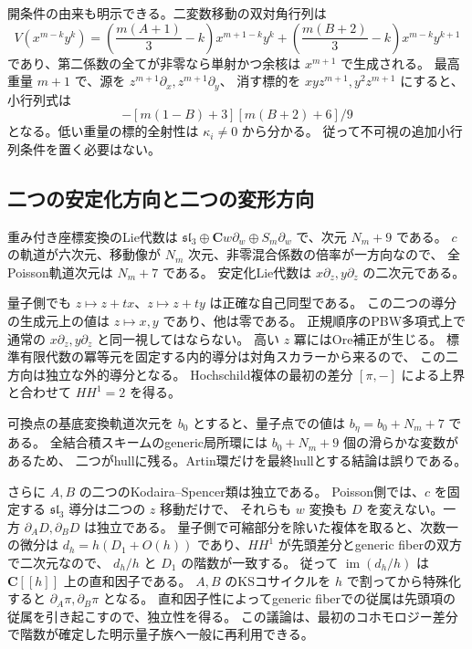 開条件の由来も明示できる。二変数移動の双対角行列は
\[
 V(x^{m-k}y^k)=
 \left(\frac{m(A+1)}3-k\right)x^{m+1-k}y^k+
 \left(\frac{m(B+2)}3-k\right)x^{m-k}y^{k+1}
\]
であり、第二係数の全てが非零なら単射かつ余核は $x^{m+1}$ で生成される。
最高重量 $m+1$ で、源を $z^{m+1}\partial_x,z^{m+1}\partial_y$、
消す標的を $xyz^{m+1},y^2z^{m+1}$ にすると、小行列式は
\[
 -[m(1-B)+3][m(B+2)+6]/9
\]
となる。低い重量の標的全射性は $\kappa_i\ne0$ から分かる。
従って不可視の追加小行列条件を置く必要はない。

\subsection{二つの安定化方向と二つの変形方向}

重み付き座標変換のLie代数は
$\mathfrak{sl}_3\oplus\mathbf Cw\partial_w\oplus S_m\partial_w$
で、次元 $N_m+9$ である。
$c$ の軌道が六次元、移動像が $N_m$ 次元、非零混合係数の倍率が一方向なので、
全Poisson軌道次元は $N_m+7$ である。
安定化Lie代数は $x\partial_z,y\partial_z$ の二次元である。

量子側でも $z\mapsto z+tx$、$z\mapsto z+ty$ は正確な自己同型である。
この二つの導分の生成元上の値は $z\mapsto x,y$ であり、他は零である。
正規順序のPBW多項式上で通常の $x\partial_z,y\partial_z$ と同一視してはならない。
高い $z$ 冪にはOre補正が生じる。
標準有限代数の冪等元を固定する内的導分は対角スカラーから来るので、
この二方向は独立な外的導分となる。
Hochschild複体の最初の差分 $[\pi,-]$ による上界と合わせて $HH^1=2$ を得る。

可換点の基底変換軌道次元を $b_0$ とすると、量子点での値は
$b_\eta=b_0+N_m+7$ である。
全結合積スキームのgeneric局所環には $b_0+N_m+9$ 個の滑らかな変数があるため、
二つがhullに残る。Artin環だけを最終hullとする結論は誤りである。

さらに $A,B$ の二つのKodaira--Spencer類は独立である。
Poisson側では、$c$ を固定する $\mathfrak{sl}_3$ 導分は二つの $z$ 移動だけで、
それらも $w$ 変換も $D$ を変えない。一方 $\partial_A D,\partial_B D$ は独立である。
量子側で可縮部分を除いた複体を取ると、次数一の微分は
$d_h=h(D_1+O(h))$ であり、$HH^1$ が先頭差分とgeneric fiberの双方で二次元なので、
$d_h/h$ と $D_1$ の階数が一致する。
従って $\operatorname{im}(d_h/h)$ は $\mathbf C[[h]]$ 上の直和因子である。
$A,B$ のKSコサイクルを $h$ で割ってから特殊化すると $\partial_A\pi,\partial_B\pi$ となる。
直和因子性によってgeneric fiberでの従属は先頭項の従属を引き起こすので、独立性を得る。
この議論は、最初のコホモロジー差分で階数が確定した明示量子族へ一般に再利用できる。

